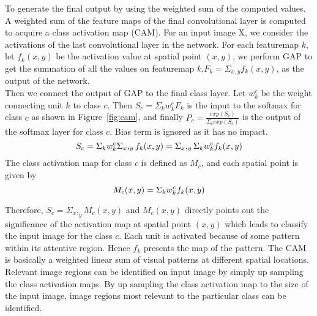 \documentclass{bioinfo}
\begin{document}
To generate the final output by using the weighted sum of the computed values. A weighted sum of the feature maps of the final convolutional layer is computed to acquire a class activation map (CAM). For an input image X, we consider the activations of the last convolutional layer in the network. For each featuremap $k$, let $f_k(x, y)$ be the activation value at spatial point $(x,y)$, we perform GAP to get the summation of all the values on featuremap $k$,$F_k =\Sigma_{x,y} f_k (x,y)$, as the output of the network.\\
Then we connect the output of GAP to the final class layer. Let $w_k^c$ be the weight connecting unit $k$ to class $c$. Then $S_c = \Sigma_k w_k^c F_k$ is the input to the softmax for class $c$ as shown in Figure~\ref{fig:cam}, and finally $P_c = \frac{exp(S_c)}{\Sigma_c exp(S_c)}$ is the output  of the softmax layer for class $c$. Bias term is ignored as it has no impact.
 \begin{equation}
S_c= \Sigma_k w_k^c \Sigma_x,_y f_k(x,y) =\Sigma_x,_y \Sigma_k w_k^c f_k (x,y)\label{eq:01}\vspace*{-10pt}
\end{equation}
The class activation map for class $c$ is defined as $M_c$, and  each spatial point is given by
 \begin{equation}
M_c(x,y)= \Sigma_k w_k^c f_k(x,y)\label{eq:02}\vspace*{-10pt}
\end{equation}

Therefore, $S_c = \Sigma_x,_y M_c(x,y)$ and $M_c(x, y)$ directly points out the significance of the activation map at spatial point $(x, y)$ which leads to classify the input image for the class $c$. Each unit is activated because of some pattern within its attentive region. Hence $f_k$ presents the map of the pattern. The CAM is basically a weighted linear sum of visual patterns at different spatial locations. Relevant image regions can be identified on input image by simply up sampling the class activation maps.
By up sampling the class activation map to the size of the input image, image regions most relevant to the particular class can be identified. 
\end{document}
